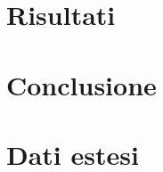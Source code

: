 \documentclass[italian, a4paper, 10pt, twocolumn]{../../style/lab_unige}
\begin{document}
    \section{Risultati}
    \label{section:results}

    \section{Conclusione}
    \label{section:conclusion}

    \appendix

    \setcounter{table}{0}
    \renewcommand{\thetable}{A\arabic{table}}

    \section{Dati estesi}
    
\end{document}
